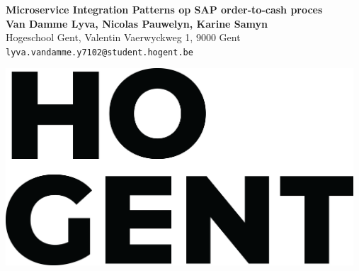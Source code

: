 \documentclass[a0,portrait]{a0poster}
\begin{document}


\begin{minipage}[t]{0.75\linewidth}
\VeryHuge \color{HoGentAccent1} \textbf{Microservice Integration Patterns op SAP order-to-cash proces} \color{Black}\\ %
\huge \textbf{Van Damme Lyva, Nicolas Pauwelyn, Karine Samyn}\\[0.5cm] %
\huge Hogeschool Gent, Valentin Vaerwyckweg 1, 9000 Gent\\[0.4cm] %
\Large \texttt{lyva.vandamme.y7102@student.hogent.be} \\
\end{minipage}
%
\begin{minipage}[t]{0.25\linewidth}
\includegraphics[width=13cm,right]{figures/HOGENT_Logo_Pos_rgb.png} 

\end{minipage}

\vspace{1cm} %

\end{document}
